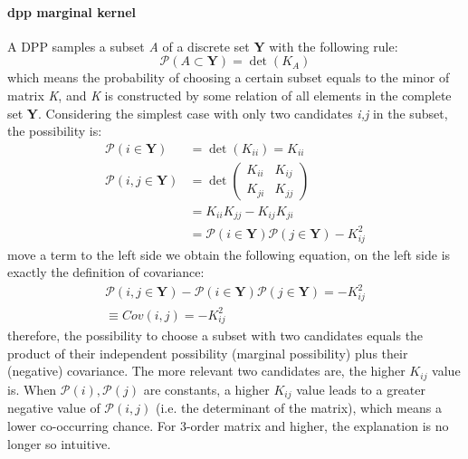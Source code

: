 \paragraph{dpp marginal kernel}
A DPP samples a subset \emph{A} of a discrete set \textbf{Y} with the following rule:
\begin{equation}\label{er:dpp}
  \mathcal{P}(A\subset\textbf{Y})=\det(K_A)
\end{equation}
which means the probability of choosing a certain subset equals to the minor of matrix \emph{K}, and \emph{K} is constructed by some relation of all elements in the complete set \textbf{Y}. Considering the simplest case with only two candidates \emph{i,j} in the subset, the possibility is:
\begin{equation}\label{eq:dpp1}
\begin{split}
  \mathcal{P}(i\in\textbf{Y})&=\det(K_{ii})=K_{ii}
\\
  \mathcal{P}(i,j\in\textbf{Y})&=\det\begin{pmatrix}
                                       K_{ii} & K_{ij} \\
                                       K_{ji} & K_{jj}
                                     \end{pmatrix}
                                      \\&=K_{ii}K_{jj}-K_{ij}K_{ji}
                                      \\&=\mathcal{P}(i\in\textbf{Y})\mathcal{P}(j\in\textbf{Y})-K_{ij}^2
\end{split}
\end{equation}
move a term to the left side we obtain the following equation, on the left side is exactly the definition of covariance:
\begin{equation}\label{eq:dpp2}
\begin{split}
  \mathcal{P}(i,j\in\textbf{Y})-\mathcal{P}(i\in\textbf{Y})\mathcal{P}(j\in\textbf{Y})=-K_{ij}^2
  \\\equiv Cov(i,j)=-K_{ij}^2
  \end{split}
\end{equation}
therefore, the possibility to choose a subset with two candidates equals the product of their independent possibility (marginal possibility) plus their (negative) covariance. The more relevant two candidates are, the higher $K_{ij}$ value is. When $\mathcal{P}(i),\mathcal{P}(j)$ are constants, a higher $K_{ij}$ value leads to a greater negative value of $\mathcal{P}(i,j)$ (i.e. the determinant of the matrix), which means a lower co-occurring chance. For 3-order matrix and higher, the explanation is no longer so intuitive.

